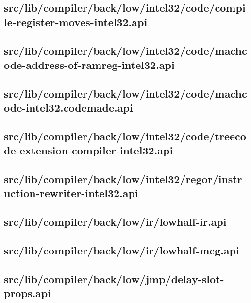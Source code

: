 \subsection{src/lib/compiler/back/low/intel32/code/compile-register-moves-intel32.api}


\subsection{src/lib/compiler/back/low/intel32/code/machcode-address-of-ramreg-intel32.api}


\subsection{src/lib/compiler/back/low/intel32/code/machcode-intel32.codemade.api}


\subsection{src/lib/compiler/back/low/intel32/code/treecode-extension-compiler-intel32.api}


\subsection{src/lib/compiler/back/low/intel32/regor/instruction-rewriter-intel32.api}


\subsection{src/lib/compiler/back/low/ir/lowhalf-ir.api}


\subsection{src/lib/compiler/back/low/ir/lowhalf-mcg.api}


\subsection{src/lib/compiler/back/low/jmp/delay-slot-props.api}


